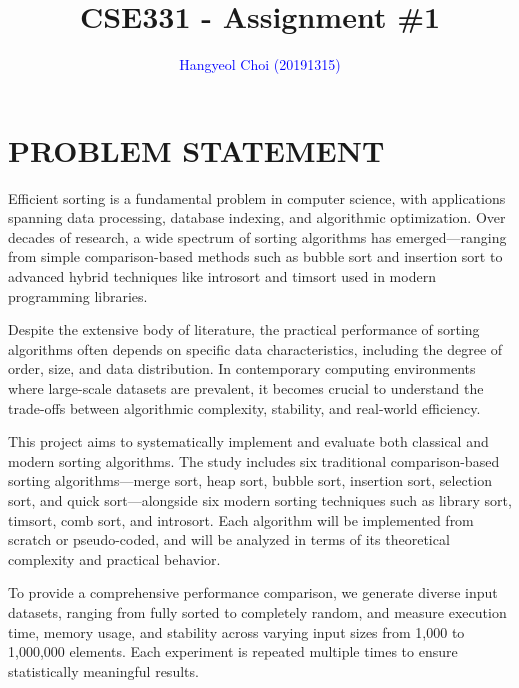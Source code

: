 \documentclass[sigconf]{acmart}
\begin{document}
\title{CSE331 - Assignment \#1}

\author{\textcolor{blue}{Hangyeol Choi (20191315)}}

\renewcommand{\shortauthors}{\textcolor{blue}{Choi et al.}}



\renewcommand\footnotetextcopyrightpermission[1]{} %



\maketitle


\section{PROBLEM STATEMENT}
Efficient sorting is a fundamental problem in computer science, with applications spanning data processing, database indexing, and algorithmic optimization. Over decades of research, a wide spectrum of sorting algorithms has emerged—ranging from simple comparison-based methods such as bubble sort and insertion sort to advanced hybrid techniques like introsort and timsort used in modern programming libraries.

Despite the extensive body of literature, the practical performance of sorting algorithms often depends on specific data characteristics, including the degree of order, size, and data distribution. In contemporary computing environments where large-scale datasets are prevalent, it becomes crucial to understand the trade-offs between algorithmic complexity, stability, and real-world efficiency.

This project aims to systematically implement and evaluate both classical and modern sorting algorithms. The study includes six traditional comparison-based sorting algorithms—merge sort, heap sort, bubble sort, insertion sort, selection sort, and quick sort—alongside six modern sorting techniques such as library sort, timsort, comb sort, and introsort. Each algorithm will be implemented from scratch or pseudo-coded, and will be analyzed in terms of its theoretical complexity and practical behavior.

To provide a comprehensive performance comparison, we generate diverse input datasets, ranging from fully sorted to completely random, and measure execution time, memory usage, and stability across varying input sizes from 1,000 to 1,000,000 elements. Each experiment is repeated multiple times to ensure statistically meaningful results.
\end{document}
